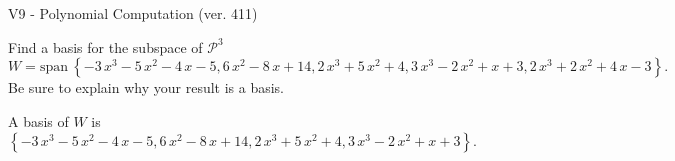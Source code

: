 \begin{exercise}
  \begin{exerciseTitle}V9 - Polynomial Computation (ver. 411)\end{exerciseTitle}
  \begin{exerciseStatement}
    Find a basis for the subspace of \(\mathcal{P}^3\) 
\[W=\mathrm{span}\ \left\{-3 \, x^{3} - 5 \, x^{2} - 4 \, x - 5 , 6 \, x^{2} - 8 \, x + 14 , 2 \, x^{3} + 5 \, x^{2} + 4 , 3 \, x^{3} - 2 \, x^{2} + x + 3 , 2 \, x^{3} + 2 \, x^{2} + 4 \, x - 3\right\}.\]
 Be sure to explain why your result is a basis.


  \end{exerciseStatement}
  \begin{exerciseAnswer}
   A basis of \(W\) is  \(\left\{-3 \, x^{3} - 5 \, x^{2} - 4 \, x - 5 , 6 \, x^{2} - 8 \, x + 14 , 2 \, x^{3} + 5 \, x^{2} + 4 , 3 \, x^{3} - 2 \, x^{2} + x + 3\right\}\).
  


  \end{exerciseAnswer}
\end{exercise}